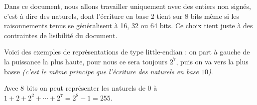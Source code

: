 Dans ce document, nous allons travailler uniquement avec des entiers non signés, c'est à dire des naturels, dont l'écriture en base 2 tient sur 8 bits même si les raisonnements tenus se généralisent à 16, 32 ou 64 bits. Ce choix tient juste à des contraintes de lisibilité du document.

\medskip

Voici des exemples de représentations de type little-endian : on part à gauche de la puissance la plus haute, pour nous ce sera toujours $2^7$, puis on va vers la plus basse \emph{(c'est le même principe que l'écriture des naturels en base $10$)}.

\medskip


\medskip


\medskip

Avec 8 bits on peut représenter les naturels de $0$ à $1 + 2 + 2^2 + \cdots + 2^7 = 2^8 - 1 = 255$.